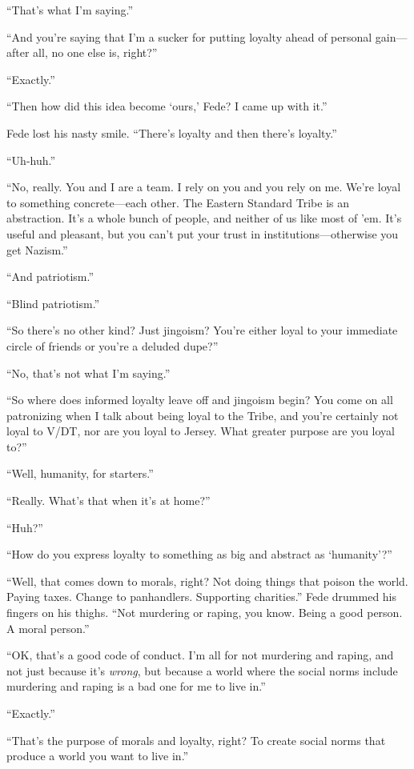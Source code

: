 “That’s what I’m saying.”

“And you’re saying that I’m a sucker for putting loyalty ahead of
personal gain—after all, no one else is, right?”

“Exactly.”

“Then how did this idea become ‘ours,’ Fede? I came up with it.”

Fede lost his nasty smile. “There’s loyalty and then there’s
loyalty.”

“Uh-huh.”

“No, really. You and I are a team. I rely on you and you rely on
me. We’re loyal to something concrete—each other. The Eastern
Standard Tribe is an abstraction. It’s a whole bunch of people, and
neither of us like most of ’em. It’s useful and pleasant, but you
can’t put your trust in institutions—otherwise you get Nazism.”

“And patriotism.”

“Blind patriotism.”

“So there’s no other kind? Just jingoism? You’re either loyal to
your immediate circle of friends or you’re a deluded dupe?”

“No, that’s not what I’m saying.”

“So where does informed loyalty leave off and jingoism begin? You
come on all patronizing when I talk about being loyal to the Tribe,
and you’re certainly not loyal to V/DT, nor are you loyal to
Jersey. What greater purpose are you loyal to?”

“Well, humanity, for starters.”

“Really. What’s that when it’s at home?”

“Huh?”

“How do you express loyalty to something as big and abstract as
‘humanity’?”

“Well, that comes down to morals, right? Not doing things that
poison the world. Paying taxes. Change to panhandlers. Supporting
charities.” Fede drummed his fingers on his thighs. “Not murdering
or raping, you know. Being a good person. A moral person.”

“OK, that’s a good code of conduct. I’m all for not murdering and
raping, and not just because it’s \emph{wrong}, but because a world
where the social norms include murdering and raping is a bad one
for me to live in.”

“Exactly.”

“That’s the purpose of morals and loyalty, right? To create social
norms that produce a world you want to live in.”

